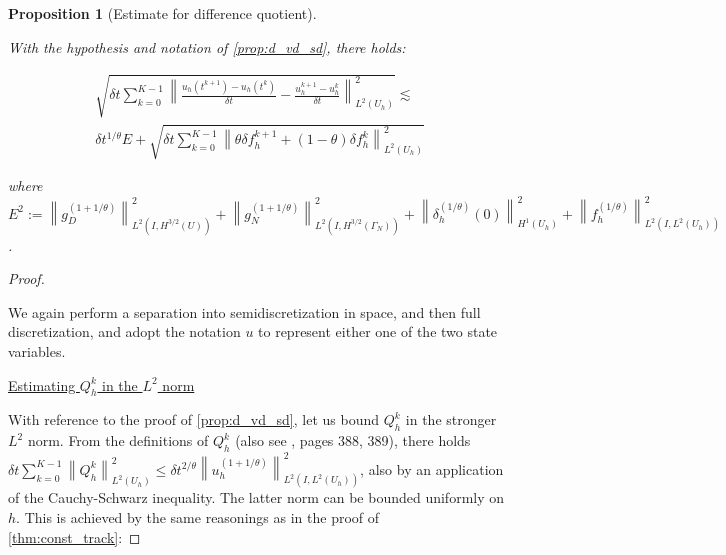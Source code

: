 \documentclass[english,a4paper,10pt,oneside]{scrbook}	%
\theoremstyle{break}
\newtheorem{prop}[equation]{Proposition}
\newenvironment{mproof}[1][\proofname]{%
  \begin{proof}[#1]$ $\par\nobreak\ignorespaces
}{%
  \end{proof}
}
\renewcommand*{\proofname}{Proof}
\theoremstyle{remark}
\newcommand{\ds}{\displaystyle}
\newcommand{\norm}[1]{\left\lVert#1\right\rVert}
\newcommand{\te}{\theta}
\begin{document}
\begin{appendices}




\begin{prop}[Estimate for difference quotient]
\label{prop:another_bound}

With the hypothesis and notation of  \cref{prop:d_vd_sd}, there holds:


\begin{align*}
	\sqrt{\delta t \sum_{k=0}^{K-1} \norm{\frac{u_h(t^{k+1})-u_h(t^k)}{\delta t} - \frac{u_h^{k+1}-u_h^{k}}{\delta t}}_{L^2(U_h)}^2}\lesssim \\\delta t^{1/\te}E +  \sqrt{\delta t \sum_{k=0}^{K-1}\norm{\theta \delta f_h^{k+1}+(1-\theta)\delta f_h^k}_{L^2(U_h)}^2}
\end{align*}

where $\ds E^2:=\norm{g_D^{(1+1/\te)}}_{L^2(I,{H^{3/2}(U)})}^2 + \norm{g_{N}^{(1+1/\te)}}_{L^2(I,{H^{3/2}(\Gamma_{N})})}^2 +\norm{\delta_h^{(1/\te)}(0)}_{H^1(U_h)}^2 + \norm{f_h^{(1/\te)}}^2_{L^2(I,L^2(U_h))}$.
\end{prop}

\begin{mproof}
We again perform a separation into semidiscretization in space, and then full discretization, and adopt the notation $u$ to represent either one of the two state variables.

\underline{Estimating $Q_h^k$ in the $L^2$ norm}

With reference to the proof of \cref{prop:d_vd_sd}, let us bound $Q_h^k$ in the stronger $L^2$ norm. From the definitions of $Q_h^k$ (also see \cite{quarteroni}, pages 388, 389), there holds $\delta t \sum_{k=0}^{K-1} \norm{Q_h^k}_{L^2(U_h)}^2\leq \delta t^{2/\te} \norm{u_h^{(1+1/\te)}}_{L^2(I,{L^2(U_h)})}^2$, also by an application of the Cauchy-Schwarz inequality. The latter norm can be bounded uniformly on $h$. This is achieved by the same reasonings as in the proof of \cref{thm:const_track}:


\end{mproof}
\end{appendices}
\end{document}
